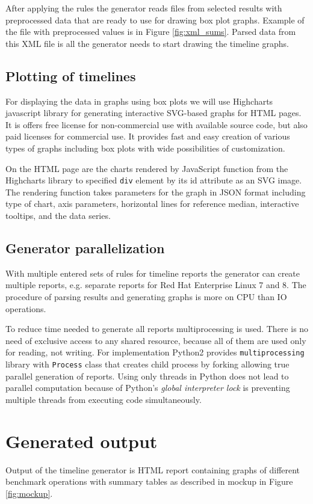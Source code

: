 After applying the rules the generator reads files from
selected results with preprocessed data that are ready to use for drawing box
plot graphs. Example of the file with preprocessed values is in Figure
\ref{fig:xml_sums}. Parsed data from this XML file is all the generator needs to
start drawing the timeline graphs.

\subsection{Plotting of timelines}
For displaying the data in graphs using box plots we will use Highcharts
javascript library\;\cite{highcharts} for generating interactive SVG-based
graphs for HTML pages. It is offers free license for non-commercial use with
available source code, but also paid licenses for commercial use. It provides
fast and easy creation of various types of graphs including box plots with wide
possibilities of customization.

On the HTML page are the charts rendered by JavaScript function from the
Highcharts library to specified \texttt{div} element by its id attribute as an
SVG image. The rendering function takes parameters for the graph in JSON format
including type of chart, axis parameters, horizontal lines for reference median,
interactive tooltips, and the data series.

\subsection{Generator parallelization}
With multiple entered sets of rules for timeline reports the generator can
create multiple reports, e.g. separate reports for Red Hat Enterprise Linux 7
and 8. The procedure of parsing results and generating graphs is more on CPU
than IO operations.

To reduce time needed to generate all reports multiprocessing is used. There is
no need of exclusive access to any shared resource, because all of them are
used only for reading, not writing. For implementation Python2 provides
\texttt{multiprocessing} library with \texttt{Process} class that creates child
process by forking allowing true parallel generation of reports. Using only
threads in Python does not lead to parallel computation because of Python's
\emph{global interpreter lock} is preventing multiple threads from executing
code simultaneously.

\section{Generated output}
Output of the timeline generator is HTML report containing graphs of different
benchmark operations with summary tables as described in mockup in Figure
\ref{fig:mockup}.


